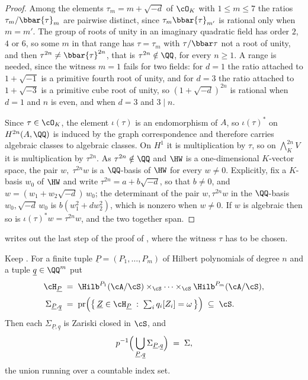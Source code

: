 \begin{proof}
Among the elements $\tau_{m}=m+\sqrt{-d}$ of $\cO_{K}$ with $1\le m\le7$ the
ratios $\tau_{m}/\bbar{\tau}_{m}$ are pairwise distinct, since
$\tau_{m}\bbar{\tau}_{m'}$ is rational only when $m=m'$. The group of roots of
unity in an imaginary quadratic field has order $2$, $4$ or $6$, so some $m$
in that range has $\tau=\tau_{m}$ with $\tau/\bbar\tau$ not a root of unity,
and then $\tau^{2n}\ne\bbar{\tau}^{2n}$, that is $\tau^{2n}\notin\QQ$, for
every $n\ge1$. A range is needed, since the witness $m=1$ fails for two
fields: for $d=1$ the ratio attached to $1+\sqrt{-1}$ is a primitive fourth
root of unity, and for $d=3$ the ratio attached to $1+\sqrt{-3}$ is a
primitive cube root of unity, so $(1+\sqrt{-d})^{2n}$ is rational when $d=1$
and $n$ is even, and when $d=3$ and $3\mid n$.

Since $\tau\in\cO_{K}$, the element $\iota(\tau)$ is an endomorphism of $A$,
so $\iota(\tau)^{*}$ on $H^{2n}(A,\QQ)$ is induced by the graph
correspondence and therefore carries algebraic classes to algebraic classes.
On $H^{1}$ it is multiplication by $\tau$, so on
$\bigwedge^{2n}_{K}V$ it is multiplication by $\tau^{2n}$. As
$\tau^{2n}\notin\QQ$ and $\HW$ is a one-dimensional $K$-vector space, the pair
$w,\;\tau^{2n}w$ is a $\QQ$-basis of $\HW$ for every $w\ne0$. Explicitly, fix
a $K$-basis $w_{0}$ of $\HW$ and write $\tau^{2n}=a+b\sqrt{-d}$, so that
$b\ne0$, and $w=(w_{1}+w_{2}\sqrt{-d})\,w_{0}$; the determinant of the pair
$w,\tau^{2n}w$ in the $\QQ$-basis $w_{0},\sqrt{-d}\,w_{0}$ is
$b(w_{1}^{2}+dw_{2}^{2})$, which is nonzero when $w\ne0$. If $w$ is
algebraic then so is $\iota(\tau)^{*}w=\tau^{2n}w$, and the two together span.
\end{proof}

 writes out the last step of the proof of
, where the witness $\tau$ has to be chosen.

\begin{theorem}\label{thm:closedlocus}
Keep . For a finite tuple $\underline{P}=(P_{1},\dots
,P_{m})$ of Hilbert polynomials of degree $n$ and a tuple
$\underline{q}\in\QQ^{m}$ put
\begin{align*}
  \cH_{\underline{P}}
  &\;=\;
  \Hilb^{P_{1}}(\cA/\cS)\times_{\cS}\cdots\times_{\cS}\Hilb^{P_{m}}(\cA/\cS),
  \\[2pt]
  \Sigma_{\underline{P},\underline{q}}
  &\;=\;
  \mathrm{pr}\Bigl(\bigl\{\,\underline{Z}\in\cH_{\underline{P}}
    \;:\;\textstyle\sum_{i}q_{i}[Z_{i}]=\omega\,\bigr\}\Bigr)
  \;\subseteq\;\cS .
\end{align*}
Then each $\Sigma_{\underline{P},\underline{q}}$ is Zariski closed in
$\cS$, and
\[
  p^{-1}\Bigl(\,\bigcup_{\underline{P},\underline{q}}
    \Sigma_{\underline{P},\underline{q}}\Bigr)\;=\;\Sigma ,
\]
the union running over a countable index set.
\end{theorem}

